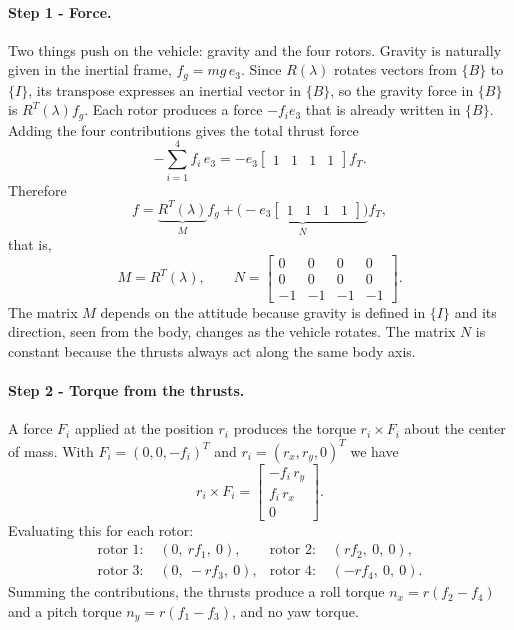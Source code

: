 \paragraph{Step 1 - Force.}
Two things push on the vehicle: gravity and the four rotors.
Gravity is naturally given in the inertial frame, $f_g = m g\, e_3$.
Since $R(\lambda)$ rotates vectors from $\{B\}$ to $\{I\}$, its transpose expresses an inertial vector in $\{B\}$, so the gravity force in $\{B\}$ is $R^T(\lambda) f_g$.
Each rotor produces a force $-f_i e_3$ that is already written in $\{B\}$.
Adding the four contributions gives the total thrust force
\begin{equation*}
-\sum_{i=1}^{4} f_i\, e_3 = -e_3 \begin{bmatrix} 1 & 1 & 1 & 1 \end{bmatrix} f_T .
\end{equation*}
Therefore
\begin{equation*}
f = \underbrace{R^T(\lambda)}_{M} f_g + \underbrace{\Big(-e_3 \begin{bmatrix} 1 & 1 & 1 & 1 \end{bmatrix}\Big)}_{N} f_T ,
\end{equation*}
that is,
\begin{equation*}
M = R^T(\lambda), \qquad
N = \begin{bmatrix} 0 & 0 & 0 & 0 \\ 0 & 0 & 0 & 0 \\ -1 & -1 & -1 & -1 \end{bmatrix}.
\end{equation*}
The matrix $M$ depends on the attitude because gravity is defined in $\{I\}$ and its direction, seen from the body, changes as the vehicle rotates.
The matrix $N$ is constant because the thrusts always act along the same body axis.

\paragraph{Step 2 - Torque from the thrusts.}
A force $F_i$ applied at the position $r_i$ produces the torque $r_i \times F_i$ about the center of mass.
With $F_i = (0, 0, -f_i)^T$ and $r_i = (r_{x}, r_{y}, 0)^T$ we have
\begin{equation*}
r_i \times F_i = \begin{bmatrix} -f_i\, r_{y} \\ f_i\, r_{x} \\ 0 \end{bmatrix}.
\end{equation*}
Evaluating this for each rotor:
\begin{align*}
\text{rotor 1: } & (0,\ r f_1,\ 0), &
\text{rotor 2: } & (r f_2,\ 0,\ 0), \\
\text{rotor 3: } & (0,\ -r f_3,\ 0), &
\text{rotor 4: } & (-r f_4,\ 0,\ 0).
\end{align*}
Summing the contributions, the thrusts produce a roll torque $n_x = r(f_2 - f_4)$ and a pitch torque $n_y = r(f_1 - f_3)$, and no yaw torque.

